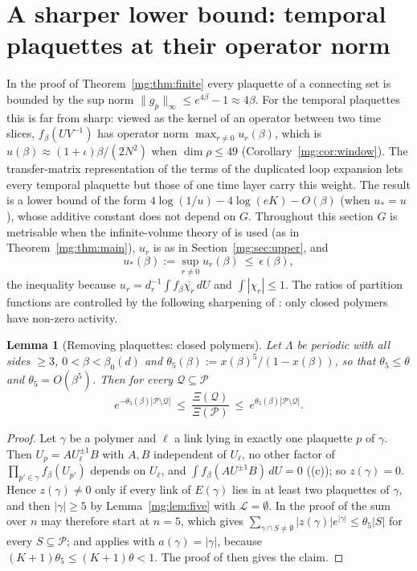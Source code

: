 \documentclass[11pt,a4paper]{article}
\newtheorem{lemma}[theorem]{Lemma}
\theoremstyle{definition}
\theoremstyle{remark}
\newcommand{\cP}{\mathcal{P}}
\newcommand{\dU}{\,dU}
\newcommand{\norm}[1]{\lVert #1\rVert}
\newcommand{\IIIref}[3]{\cite[#1~`#2' (\texttt{#3})]{III}}
\newcommand{\IIIlab}[2]{\cite[#1 \texttt{#2}]{III}}
\begin{document}
\section{A sharper lower bound: temporal plaquettes at their operator norm}\label{mg:sec:sharp}

In the proof of Theorem~\ref{mg:thm:finite} every plaquette of a connecting set is bounded by the sup norm
$\norm{g_p}_\infty\le e^{4\beta}-1\approx4\beta$. For the temporal plaquettes this is far from sharp: viewed as the kernel of an operator
between two time slices, $f_\beta(UV^{-1})$ has operator norm $\max_{r\neq0}u_r(\beta)$, which is $u(\beta)\approx(1+\iota)\beta/(2N^2)$ when
$\dim\rho\le49$ (Corollary~\ref{mg:cor:window}). The
transfer-matrix representation of the terms of the duplicated loop expansion lets every temporal plaquette but those of one time layer
carry this weight. The result is a lower bound of the form $4\log(1/u)-4\log(eK)-O(\beta)$ (when $u_*=u$), whose additive constant does not
depend on $G$. Throughout this section $G$ is metrisable when the infinite-volume theory of \cite{II} is used (as in Theorem~\ref{mg:thm:main}),
$u_r$ is as in Section~\ref{mg:sec:upper}, and
\[
u_*(\beta):=\sup_{r\neq0}u_r(\beta)\ \le\ \epsilon(\beta),
\]
the inequality because $u_r=d_r^{-1}\int f_\beta\overline{\chi_r}\dU$ and $\int|\chi_r|\le1$. The ratios of partition functions are controlled by
the following sharpening of \IIIref{Proposition}{Removing plaquettes}{al:prop:remove}: only closed polymers have non-zero activity.

\begin{lemma}[Removing plaquettes: closed polymers]\label{mg:lem:closed}
Let $\Lambda$ be periodic with all sides $\ge3$, $0<\beta<\beta_0(d)$ and $\theta_5(\beta):=x(\beta)^5/(1-x(\beta))$, so that $\theta_5\le\theta$ and
$\theta_5=O(\beta^5)$. Then for every $\mathcal Q\subseteq\cP$
\[
e^{-\theta_5(\beta)|\cP\setminus\mathcal Q|}\ \le\ \frac{\Xi(\mathcal Q)}{\Xi(\cP)}\ \le\ e^{\theta_5(\beta)|\cP\setminus\mathcal Q|} .
\]
\end{lemma}

\begin{proof}
Let $\gamma$ be a polymer and $\ell$ a link lying in exactly one plaquette $p$ of $\gamma$. Then $U_p=AU_\ell^{\pm1}B$ with $A,B$ independent of $U_\ell$, no
other factor of $\prod_{p'\in\gamma}f_\beta(U_{p'})$ depends on $U_\ell$, and $\int f_\beta(AU^{\pm1}B)\dU=0$ (\IIIlab{Lemma}{al:lem:facts}(c)); so
$z(\gamma)=0$. Hence $z(\gamma)\ne0$ only if every link of $E(\gamma)$ lies in at least two plaquettes of $\gamma$, and then $|\gamma|\ge5$ by
Lemma~\ref{mg:lem:five} with $\mathcal L=\emptyset$. In the proof of \IIIref{Lemma}{The Kotecký--Preiss condition for plaquette polymers}{al:lem:KPsums}
the sum over $n$ may therefore start at $n=5$, which gives $\sum_{\gamma\cap S\ne\emptyset}|z(\gamma)|e^{|\gamma|}\le\theta_5|S|$ for every $S\subseteq\cP$; and
\IIIlab{Lemma}{al:lem:ratio} applies with $a(\gamma)=|\gamma|$, because $(K+1)\theta_5\le(K+1)\theta<1$. The proof of
\IIIlab{Proposition}{al:prop:remove} then gives the claim.
\end{proof}
\end{document}
